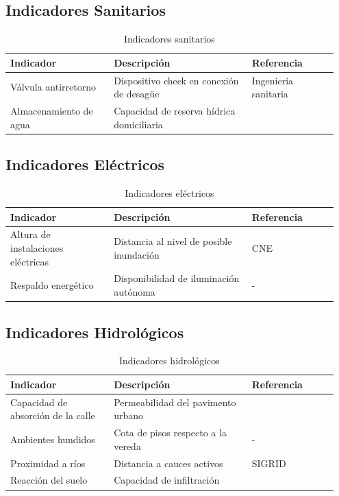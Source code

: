 \documentclass[12pt, letterpaper]{article}
\begin{document}
\subsection{Indicadores Sanitarios}

\begin{table}[H]
\centering
\caption{Indicadores sanitarios}
\label{tab:ind_sanitarios}
\begin{tabular}{@{}p{0.3\linewidth}p{0.4\linewidth}p{0.25\linewidth}@{}}
\toprule
\textbf{Indicador} & \textbf{Descripción} & \textbf{Referencia} \\ \midrule
Válvula antirretorno & Dispositivo check en conexión de desagüe & Ingeniería sanitaria \parencite{usat_drenaje} \\
Almacenamiento de agua & Capacidad de reserva hídrica domiciliaria & \parencite{geresa_sala} \\ \bottomrule
\end{tabular}
\end{table}

\subsection{Indicadores Eléctricos}

\begin{table}[H]
\centering
\caption{Indicadores eléctricos}
\label{tab:ind_electricos}
\begin{tabular}{@{}p{0.3\linewidth}p{0.4\linewidth}p{0.25\linewidth}@{}}
\toprule
\textbf{Indicador} & \textbf{Descripción} & \textbf{Referencia} \\ \midrule
Altura de instalaciones eléctricas & Distancia al nivel de posible inundación & CNE \parencite{osinergmin_cne} \\
Respaldo energético & Disponibilidad de iluminación autónoma & - \\ \bottomrule
\end{tabular}
\end{table}

\subsection{Indicadores Hidrológicos}

\begin{table}[H]
\centering
\caption{Indicadores hidrológicos}
\label{tab:ind_hidrologicos}
\begin{tabular}{@{}p{0.3\linewidth}p{0.4\linewidth}p{0.25\linewidth}@{}}
\toprule
\textbf{Indicador} & \textbf{Descripción} & \textbf{Referencia} \\ \midrule
Capacidad de absorción de la calle & Permeabilidad del pavimento urbano & \parencite{typsa_drenaje, usat_drenaje} \\
Ambientes hundidos & Cota de pisos respecto a la vereda & - \\
Proximidad a ríos & Distancia a cauces activos & SIGRID \parencite{gob_regional_lambayeque_2023} \\
Reacción del suelo & Capacidad de infiltración & \parencite{cenepred_jornada} \\ \bottomrule
\end{tabular}
\end{table}
\end{document}

